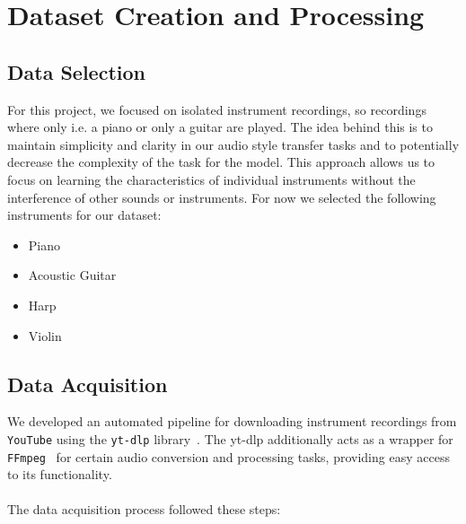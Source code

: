 \section{Dataset Creation and Processing}

\subsection{Data Selection}
For this project, we focused on isolated instrument recordings, so recordings where only i.e. a piano or only a guitar are played.
The idea behind this is to maintain simplicity and clarity in our audio style transfer tasks and to potentially decrease the complexity of the task for the model.
This approach allows us to focus on learning the characteristics of individual instruments without the interference of other sounds or instruments.
For now we selected the following instruments for our dataset:
\begin{itemize}
    \item Piano
    \item Acoustic Guitar
    \item Harp
    \item Violin
\end{itemize}

\subsection{Data Acquisition}
\label{sec:data_acquisition}
We developed an automated pipeline for downloading instrument recordings from \texttt{YouTube} using the \texttt{yt-dlp} library~\cite{youtube,yt-dlp}.
The yt-dlp additionally acts as a wrapper for \texttt{FFmpeg}~\cite{ffmpeg} for certain audio conversion and processing tasks, providing easy access to its functionality.
\\\\
The data acquisition process followed these steps:

